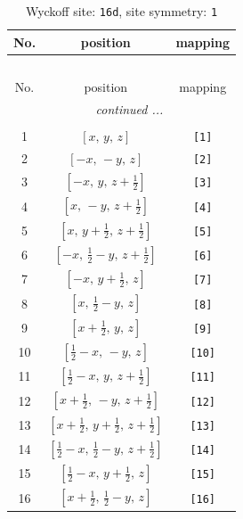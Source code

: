 \documentclass[fleqn,8pt]{jsarticle}
\begin{document}
\begin{longtable}{ccc}
\caption{Wyckoff site: {\tt 16d}, site symmetry: {\tt 1}}
 \\
 \hline \hline
No. & position & mapping \\ \hline \endfirsthead

\multicolumn{2}{l}{\tablename\ \thetable{}} \\
 \hline \hline
No. & position & mapping \\ \hline \endhead

 \hline \hline
\multicolumn{2}{r}{\footnotesize\it continued ...} \\ \endfoot

 \hline \hline
\multicolumn{2}{r}{} \\ \endlastfoot

1 & $\left[ x,\, y,\, z \right]$ & {\tt [1]} \\ \hline
2 & $\left[ - x,\, - y,\, z \right]$ & {\tt [2]} \\ \hline
3 & $\left[ - x,\, y,\, z + \frac{1}{2} \right]$ & {\tt [3]} \\ \hline
4 & $\left[ x,\, - y,\, z + \frac{1}{2} \right]$ & {\tt [4]} \\ \hline
5 & $\left[ x,\, y + \frac{1}{2},\, z + \frac{1}{2} \right]$ & {\tt [5]} \\ \hline
6 & $\left[ - x,\, \frac{1}{2} - y,\, z + \frac{1}{2} \right]$ & {\tt [6]} \\ \hline
7 & $\left[ - x,\, y + \frac{1}{2},\, z \right]$ & {\tt [7]} \\ \hline
8 & $\left[ x,\, \frac{1}{2} - y,\, z \right]$ & {\tt [8]} \\ \hline
9 & $\left[ x + \frac{1}{2},\, y,\, z \right]$ & {\tt [9]} \\ \hline
10 & $\left[ \frac{1}{2} - x,\, - y,\, z \right]$ & {\tt [10]} \\ \hline
11 & $\left[ \frac{1}{2} - x,\, y,\, z + \frac{1}{2} \right]$ & {\tt [11]} \\ \hline
12 & $\left[ x + \frac{1}{2},\, - y,\, z + \frac{1}{2} \right]$ & {\tt [12]} \\ \hline
13 & $\left[ x + \frac{1}{2},\, y + \frac{1}{2},\, z + \frac{1}{2} \right]$ & {\tt [13]} \\ \hline
14 & $\left[ \frac{1}{2} - x,\, \frac{1}{2} - y,\, z + \frac{1}{2} \right]$ & {\tt [14]} \\ \hline
15 & $\left[ \frac{1}{2} - x,\, y + \frac{1}{2},\, z \right]$ & {\tt [15]} \\ \hline
16 & $\left[ x + \frac{1}{2},\, \frac{1}{2} - y,\, z \right]$ & {\tt [16]} \\
\end{longtable}
\end{document}
